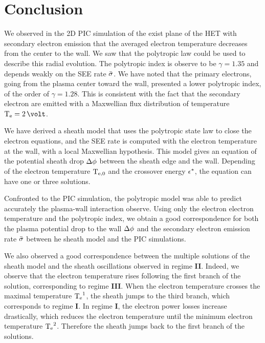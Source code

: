 

\section{Conclusion} \label{subsec-concuslion_ch4}

We observed in the \ac{2D} \ac{PIC} simulation of the exist plane of the \ac{HET} with secondary electron emission that the averaged electron temperature decreases from the center to the wall.
We saw that the polytropic law could be used to describe this radial evolution.
The polytropic index is observe to be $\gamma=1.35$ and depends weakly on the \ac{SEE} rate $ \bar{\sigma }$.
We have noted that the primary electrons, going from the plasma center toward the wall, presented a lower polytropic index, of the order of $\gamma=1.28$.
This is consistent with the fact that the secondary electron are emitted with a Maxwellian flux distribution of temperature $\Te=2\,\volt$.

We have derived a sheath model that uses the polytropic state law to close the electron equations, and the \ac{SEE} rate is computed with the electron temperature at the wall, with a local Maxwellian hypothesis.
This model gives an equation of the potential sheath drop $\Delta \phi$ between the sheath edge and the wall.
Depending of the electron temperature $\mathrm{T_{e, 0}}$ and the crossover energy $\epsilon^{*}$, the equation can have one or three solutions.

Confronted to the \ac{PIC} simulation, the polytropic model was able to predict accurately the plasma-wall interaction observe.
Using only the electron electron temperature and the polytropic index, we obtain a good correspondence for both the plasma potential drop to the wall $\Delta \phi$ and the secondary electron emission rate $ \bar{\sigma }$ between he sheath model and the \ac{PIC} simulations.

We also observed a good correspondence between the multiple solutions of the sheath model and the sheath oscillations observed in regime {\bf II}.
Indeed, we observe that the electron temperature rises following the first branch of the solution, corresponding to regime {\bf III}.
When the electron temperature crosses the maximal temperature $\mathrm{T_e}^1$, the sheath jumps to the third branch, which corresponds to regime {\bf I}.
In regime {\bf I}, the electron power losses increase drastically, which reduces the electron temperature until the minimum electron temperature $\mathrm{T_e}^2$.
Therefore the sheath jumps back to the first branch of the solutions.

